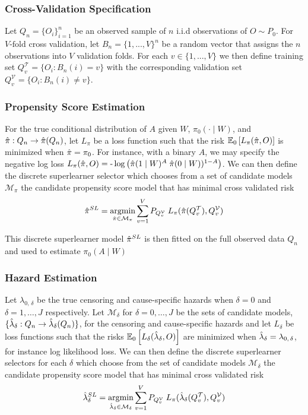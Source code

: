 \documentclass{report}
\DeclareMathOperator*{\argmin}{argmin}
\newcommand{\1}{\ensuremath{\mathbf{1}}}
\newcommand{\X}{\ensuremath{{W}}}
\newcommand{\g}{\ensuremath{\pi}}
\begin{document}
\subsubsection{Cross-Validation Specification}
\label{sec:org4b2e080}
Let \(Q_n = \{O_i\}_{i=1}^n\) be an observed sample of \(n\) i.i.d observations of \(O \sim P_0\). For \(V\text{-fold}\) cross validation, let \(B_n = \{1, ... , V\}^n\) be a random vector that assigns the \(n\) observations into \(V\) validation folds. For each \(v \in \{1, ..., V\}\) we then define training set \(Q^\mathcal{T}_v = \{O_i : B_n(i) = v\}\) with the corresponding validation set \(Q^\mathcal{V}_v = \{O_i : B_n(i) \neq v\}\).

\subsubsection{Propensity Score Estimation}
\label{sec:orgc6076f9}
For the true conditional distribution of \(A\) given \(\X\), \(\g_0(\cdot \mid \X)\), and \(\Hat{\g} : Q_n \to \Hat{\g}(Q_n)\), let \(L_\g\) be a loss function such that the risk \(\mathbb{E}_0\left[L_\g(\Hat{\g}, O)\right]\) is minimized when \(\Hat{\g} = \g_0\). For instance, with a binary \(A\), we may specify the negative log loss \(L_\g(\Hat{\g}, O) = \text{-}\log\left(\Hat{\g}(1 \mid \X)^A \; \Hat{\g}(0 \mid \X))^{1-A}\right)\). We can then define the discrete superlearner selector which chooses from a set of candidate models \(\mathcal{M_\g}\) the candidate propensity score model that has minimal cross validated risk 
\[ \Hat{\g}^{SL} = \argmin_{\Hat{\g} \in \mathcal{M}_\g} \sum_{v = 1}^{V} P_{Q^\mathcal{V}_v} \; L_\g(\Hat{\g}(Q^\mathcal{T}_v), Q^\mathcal{V}_v)\]

This discrete superlearner model \(\Hat{\g}^{SL}\) is then fitted on the full observed data \(Q_n\) and used to estimate \(\g_0(A \mid \X)\)

\subsubsection{Hazard Estimation}
\label{sec:orga4333cc}
Let \(\lambda_{0,\,\delta}\) be the true censoring and cause-specific hazards when \(\delta = 0\) and \(\delta = 1, \dots, J\) respectively. Let \(\mathcal{M}_\delta\) for \(\delta = 0, \dots, J\) be the sets of candidate models, \(\{\Hat{\lambda}_\delta : Q_n \to \Hat{\lambda}_\delta(Q_n)\}\), for the censoring and cause-specific hazards and let \(L_\delta\) be loss functions such that the risks \(\mathbb{E}_0\left[L_\delta(\Hat{\lambda}_\delta, O)\right]\) are minimized when \(\Hat{\lambda}_\delta = \lambda_{0,\,\delta}\), for instance log likelihood loss. We can then define the discrete superlearner selectors for each \(\delta\) which choose from the set of candidate models \(\mathcal{M_\delta}\) the candidate propensity score model that has minimal cross validated risk 
\[ \Hat{\lambda}_\delta^{SL} = \argmin_{\Hat{\lambda}_\delta \in \mathcal{M}_\delta} \sum_{v = 1}^{V} P_{Q^\mathcal{V}_v} \; L_\g(\Hat{\lambda}_\delta(Q^\mathcal{T}_v), Q^\mathcal{V}_v)\]
\end{document}
